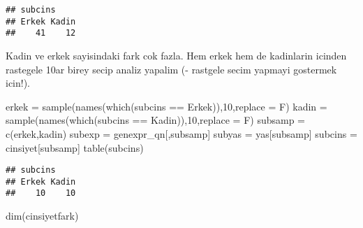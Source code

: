 \documentclass[
]{book}
\newenvironment{Shaded}{\begin{snugshade}}{\end{snugshade}}
\newcommand{\AttributeTok}[1]{\textcolor[rgb]{0.77,0.63,0.00}{#1}}
\newcommand{\ControlFlowTok}[1]{\textcolor[rgb]{0.13,0.29,0.53}{\textbf{#1}}}
\newcommand{\DecValTok}[1]{\textcolor[rgb]{0.00,0.00,0.81}{#1}}
\newcommand{\FunctionTok}[1]{\textcolor[rgb]{0.00,0.00,0.00}{#1}}
\newcommand{\NormalTok}[1]{#1}
\newcommand{\OtherTok}[1]{\textcolor[rgb]{0.56,0.35,0.01}{#1}}
\newcommand{\SpecialCharTok}[1]{\textcolor[rgb]{0.00,0.00,0.00}{#1}}
\newcommand{\StringTok}[1]{\textcolor[rgb]{0.31,0.60,0.02}{#1}}
\begin{document}
\begin{verbatim}
## subcins
## Erkek Kadin 
##    41    12
\end{verbatim}

Kadin ve erkek sayisindaki fark cok fazla. Hem erkek hem de kadinlarin icinden rastegele 10ar birey secip analiz yapalim (- rastgele secim yapmayi gostermek icin!).

\begin{Shaded}
\begin{Highlighting}[]
\NormalTok{erkek }\OtherTok{=} \FunctionTok{sample}\NormalTok{(}\FunctionTok{names}\NormalTok{(}\FunctionTok{which}\NormalTok{(subcins }\SpecialCharTok{==} \StringTok{\textquotesingle{}Erkek\textquotesingle{}}\NormalTok{)),}\DecValTok{10}\NormalTok{,}\AttributeTok{replace =}\NormalTok{ F)}
\NormalTok{kadin }\OtherTok{=} \FunctionTok{sample}\NormalTok{(}\FunctionTok{names}\NormalTok{(}\FunctionTok{which}\NormalTok{(subcins }\SpecialCharTok{==} \StringTok{\textquotesingle{}Kadin\textquotesingle{}}\NormalTok{)),}\DecValTok{10}\NormalTok{,}\AttributeTok{replace =}\NormalTok{ F)}
\NormalTok{subsamp }\OtherTok{=} \FunctionTok{c}\NormalTok{(erkek,kadin)}
\NormalTok{subexp }\OtherTok{=}\NormalTok{ genexpr\_qn[,subsamp]}
\NormalTok{subyas }\OtherTok{=}\NormalTok{ yas[subsamp]}
\NormalTok{subcins }\OtherTok{=}\NormalTok{ cinsiyet[subsamp]}
\FunctionTok{table}\NormalTok{(subcins)}
\end{Highlighting}
\end{Shaded}

\begin{verbatim}
## subcins
## Erkek Kadin 
##    10    10
\end{verbatim}

\begin{Shaded}
\end{Shaded}

\begin{Shaded}
\begin{Highlighting}[]
\FunctionTok{dim}\NormalTok{(cinsiyetfark)}
\end{Highlighting}
\end{Shaded}
\end{document}
